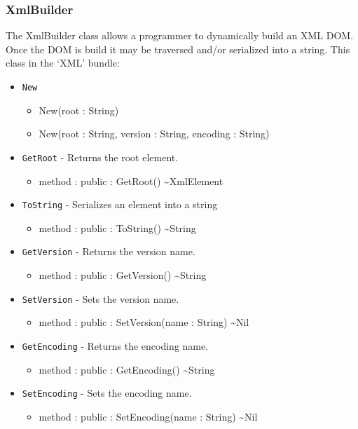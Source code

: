 \documentclass[11pt]{article}
\begin{document}
\subsubsection{XmlBuilder}
The XmlBuilder class allows a programmer to dynamically build an XML
DOM.  Once the DOM is build it may be traversed and/or serialized into
a string. This class in the `XML' bundle:
\begin{itemize}
\item \texttt{New}
  \begin{itemize}
  \item New(root : String)
  \item New(root : String, version : String, encoding : String)
  \end{itemize}
\item \texttt{GetRoot} - Returns the root element.
  \begin{itemize}
  \item method : public : GetRoot() \textasciitilde XmlElement
  \end{itemize}
\item \texttt{ToString} - Serializes an element into a string
  \begin{itemize}
  \item method : public : ToString() \textasciitilde String
  \end{itemize}
\item \texttt{GetVersion} - Returns the version name.
  \begin{itemize}
  \item method : public : GetVersion() \textasciitilde String
  \end{itemize}
\item \texttt{SetVersion} - Sets the version name.
  \begin{itemize}
  \item method : public : SetVersion(name : String) \textasciitilde Nil
  \end{itemize}
\item \texttt{GetEncoding} - Returns the encoding name.
  \begin{itemize}
  \item method : public : GetEncoding() \textasciitilde String
  \end{itemize}
\item \texttt{SetEncoding} - Sets the encoding name.
  \begin{itemize}
  \item method : public : SetEncoding(name : String) \textasciitilde Nil
  \end{itemize}
\end{itemize}
\end{document}
